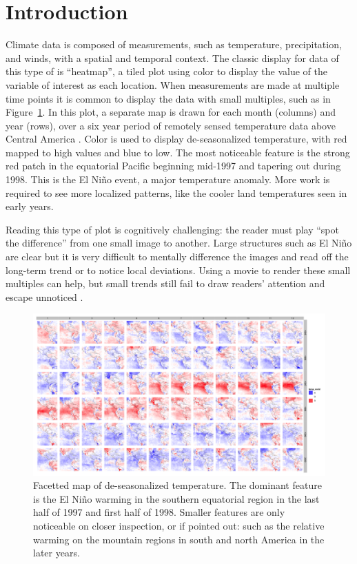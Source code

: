 \documentclass[oneside]{article}
\begin{document}
\section{Introduction}

Climate data is composed of measurements, such as temperature, precipitation, and winds, with a spatial and temporal context. The classic display for data of this type of is ``heatmap'', a tiled plot using color to display the value of the variable of interest as each location. When measurements are made at multiple time points it is common to display the data with small multiples, such as in Figure~\ref{fig:nasa-facet}. In this plot, a separate map is drawn for each month (columns) and year (rows), over a six year period of remotely sensed temperature data above Central America \citep{murrell:2010}. Color is used to display de-seasonalized temperature, with red mapped to high values and blue to low. The most noticeable feature is the strong red patch in the equatorial Pacific beginning mid-1997 and tapering out during 1998. This is the El Ni\~no event, a major temperature anomaly. More work is required to see more localized patterns, like the cooler land temperatures seen in early years.

Reading this type of plot is cognitively challenging: the reader must play ``spot the difference'' from one small image to another. Large structures such as El Ni\~no are clear but it is very difficult to mentally difference the images and read off the long-term trend or to notice local deviations. Using a movie to render these small multiples can help, but small trends still fail to draw readers' attention and escape unnoticed \citep{simons:gradual}.

\begin{figure}[htbp]
  \centering
  \includegraphics[width=5.5in]{nasa-colored-map.png}
  \caption{Facetted map of de-seasonalized temperature. The dominant feature is the El Ni\~no warming in the southern equatorial region in the last half of 1997 and first half of 1998. Smaller features are only noticeable on closer inspection, or if pointed out: such as the relative warming on the mountain regions in south and north America in the later years.}
  \label{fig:nasa-facet}
\end{figure}
\end{document}
